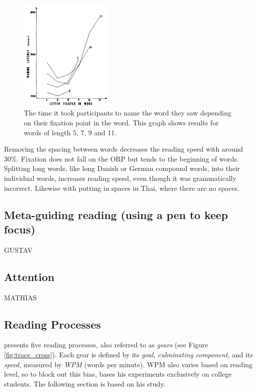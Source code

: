 \begin{figure}[htbp]
\centering
\includegraphics[width=0.4\textwidth]{Pics/ucurve}
\caption{The time it took participants to name the word they saw depending on their fixation point in the word. This graph shows results for words of length 5, 7, 9 and 11. \protect\cite{oregan_convenient_1984}}
\label{fig:ucurve}
\end{figure}

Removing the spacing between words decreases the reading speed with around 30\%. Fixation does not fall on the ORP but tends to the beginning of words. Splitting long words, like long Danish or German compound words, into their individual words, increases reading speed, even though it was grammatically incorrect. Likewise with putting in spaces in Thai, where there are no spaces.

\subsection{Meta-guiding reading (using a pen to keep focus)}
GUSTAV

\subsection{Attention}
MATHIAS

\subsection{Reading Processes}
 presents five reading processes, also referred to as \textit{gears} (see Figure \ref{fig:trace_cross}). Each gear is defined by its \textit{goal}, \textit{culminating component}, and its \textit{speed}, measured by \textit{WPM} (words per minute). WPM also varies based on reading level, so to block out this bias, \citeauthor{carver_reading_1992} bases his experiments exclusively on college students. The following section is based on his study.

